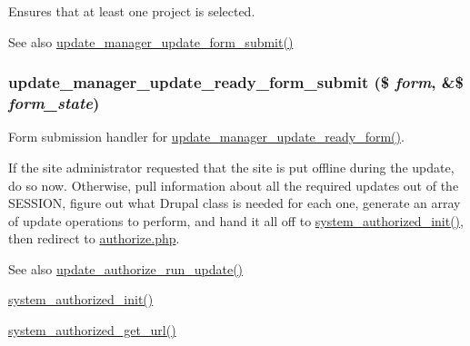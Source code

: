 Ensures that at least one project is selected.

\begin{DoxySeeAlso}{See also}
\hyperlink{group__update__manager__update_gaec3a60b324711da2e658cf10d9b85447}{update\_\-manager\_\-update\_\-form\_\-submit()} 
\end{DoxySeeAlso}
\hypertarget{group__update__manager__update_gaeab4690bf95cb0d0b517a0b9161e5045}{
\subsubsection[{update\_\-manager\_\-update\_\-ready\_\-form\_\-submit}]{\setlength{\rightskip}{0pt plus 5cm}update\_\-manager\_\-update\_\-ready\_\-form\_\-submit (\$ {\em form}, \/  \&\$ {\em form\_\-state})}}
\label{group__update__manager__update_gaeab4690bf95cb0d0b517a0b9161e5045}
Form submission handler for \hyperlink{group__forms_gab1105c1314e1bd8822eef3cb16f78b26}{update\_\-manager\_\-update\_\-ready\_\-form()}.

If the site administrator requested that the site is put offline during the update, do so now. Otherwise, pull information about all the required updates out of the SESSION, figure out what Drupal class is needed for each one, generate an array of update operations to perform, and hand it all off to \hyperlink{group__authorize_ga17756b29805705dbea25798d6004d5dd}{system\_\-authorized\_\-init()}, then redirect to \hyperlink{authorize_8php}{authorize.php}.

\begin{DoxySeeAlso}{See also}
\hyperlink{update_8authorize_8inc_a640c629480dadbca39814ac8be63e21b}{update\_\-authorize\_\-run\_\-update()} 

\hyperlink{group__authorize_ga17756b29805705dbea25798d6004d5dd}{system\_\-authorized\_\-init()} 

\hyperlink{group__authorize_gab59393fbd369097724650dec4be9c1dd}{system\_\-authorized\_\-get\_\-url()} 
\end{DoxySeeAlso}
